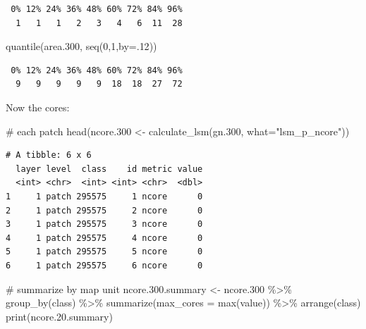 \documentclass[
  letterpaper,
  DIV=11,
  numbers=noendperiod]{scrartcl}
\newenvironment{Shaded}{\begin{snugshade}}{\end{snugshade}}
\newcommand{\AttributeTok}[1]{\textcolor[rgb]{0.40,0.45,0.13}{#1}}
\newcommand{\CommentTok}[1]{\textcolor[rgb]{0.37,0.37,0.37}{#1}}
\newcommand{\DecValTok}[1]{\textcolor[rgb]{0.68,0.00,0.00}{#1}}
\newcommand{\FloatTok}[1]{\textcolor[rgb]{0.68,0.00,0.00}{#1}}
\newcommand{\FunctionTok}[1]{\textcolor[rgb]{0.28,0.35,0.67}{#1}}
\newcommand{\NormalTok}[1]{\textcolor[rgb]{0.00,0.23,0.31}{#1}}
\newcommand{\OtherTok}[1]{\textcolor[rgb]{0.00,0.23,0.31}{#1}}
\newcommand{\SpecialCharTok}[1]{\textcolor[rgb]{0.37,0.37,0.37}{#1}}
\newcommand{\StringTok}[1]{\textcolor[rgb]{0.13,0.47,0.30}{#1}}
\begin{document}
\begin{verbatim}
 0% 12% 24% 36% 48% 60% 72% 84% 96% 
  1   1   1   2   3   4   6  11  28 
\end{verbatim}

\begin{Shaded}
\begin{Highlighting}[]
\FunctionTok{quantile}\NormalTok{(area}\FloatTok{.300}\NormalTok{, }\FunctionTok{seq}\NormalTok{(}\DecValTok{0}\NormalTok{,}\DecValTok{1}\NormalTok{,}\AttributeTok{by=}\NormalTok{.}\DecValTok{12}\NormalTok{))}
\end{Highlighting}
\end{Shaded}

\begin{verbatim}
 0% 12% 24% 36% 48% 60% 72% 84% 96% 
  9   9   9   9   9  18  18  27  72 
\end{verbatim}

Now the cores:

\begin{Shaded}
\begin{Highlighting}[]
\CommentTok{\# each patch}
\FunctionTok{head}\NormalTok{(ncore}\FloatTok{.300} \OtherTok{\textless{}{-}} \FunctionTok{calculate\_lsm}\NormalTok{(gn}\FloatTok{.300}\NormalTok{, }\AttributeTok{what=}\StringTok{"lsm\_p\_ncore"}\NormalTok{))}
\end{Highlighting}
\end{Shaded}

\begin{verbatim}
# A tibble: 6 x 6
  layer level  class    id metric value
  <int> <chr>  <int> <int> <chr>  <dbl>
1     1 patch 295575     1 ncore      0
2     1 patch 295575     2 ncore      0
3     1 patch 295575     3 ncore      0
4     1 patch 295575     4 ncore      0
5     1 patch 295575     5 ncore      0
6     1 patch 295575     6 ncore      0
\end{verbatim}

\begin{Shaded}
\begin{Highlighting}[]
\CommentTok{\# summarize by map unit}
\NormalTok{ncore.}\FloatTok{300.}\NormalTok{summary }\OtherTok{\textless{}{-}}\NormalTok{ ncore}\FloatTok{.300} \SpecialCharTok{\%\textgreater{}\%} \FunctionTok{group\_by}\NormalTok{(class) }\SpecialCharTok{\%\textgreater{}\%}
  \FunctionTok{summarize}\NormalTok{(}\AttributeTok{max\_cores =} \FunctionTok{max}\NormalTok{(value)) }\SpecialCharTok{\%\textgreater{}\%}
  \FunctionTok{arrange}\NormalTok{(class)}
\FunctionTok{print}\NormalTok{(ncore.}\FloatTok{20.}\NormalTok{summary)}
\end{Highlighting}
\end{Shaded}
\end{document}
